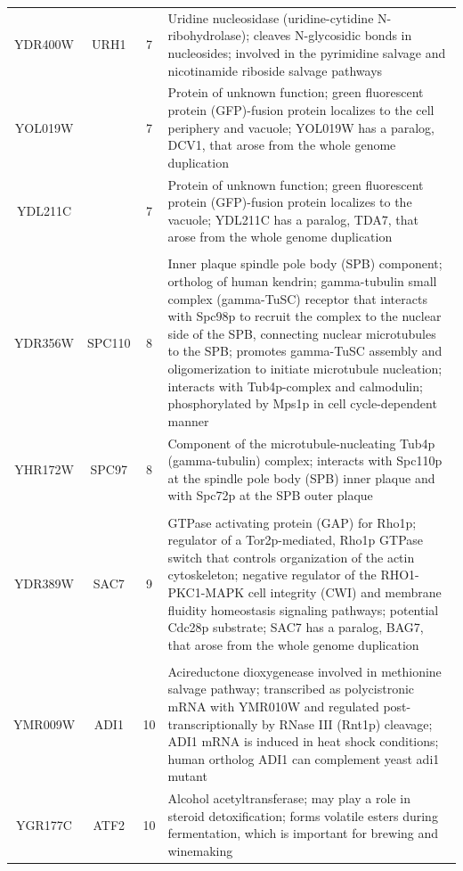 \documentclass[]{article}
\begin{document}
\begin{longtable}{@{\extracolsep{3pt}} cccp{85mm}}
		YDR400W & URH1 & 7 & Uridine nucleosidase (uridine-cytidine N-ribohydrolase); cleaves N-glycosidic bonds in nucleosides; involved in the pyrimidine salvage and nicotinamide riboside salvage pathways \\ 
		YOL019W &  & 7 & Protein of unknown function; green fluorescent protein (GFP)-fusion protein localizes to the cell periphery and vacuole; YOL019W has a paralog, DCV1, that arose from the whole genome duplication \\ 
		YDL211C &  & 7 & Protein of unknown function; green fluorescent protein (GFP)-fusion protein localizes to the vacuole; YDL211C has a paralog, TDA7, that arose from the whole genome duplication \\ \hline \\[-1.8ex]
		YDR356W & SPC110 & 8 & Inner plaque spindle pole body (SPB) component; ortholog of human kendrin; gamma-tubulin small complex (gamma-TuSC) receptor that interacts with Spc98p to recruit the complex to the nuclear side of the SPB, connecting nuclear microtubules to the SPB; promotes gamma-TuSC assembly and oligomerization to initiate microtubule nucleation; interacts with Tub4p-complex and calmodulin; phosphorylated by Mps1p in cell cycle-dependent manner \\ 
		YHR172W & SPC97 & 8 & Component of the microtubule-nucleating Tub4p (gamma-tubulin) complex; interacts with Spc110p at the spindle pole body (SPB) inner plaque and with Spc72p at the SPB outer plaque \\ \hline \\[-1.8ex]
		YDR389W & SAC7 & 9 & GTPase activating protein (GAP) for Rho1p; regulator of a Tor2p-mediated, Rho1p GTPase switch that controls organization of the actin cytoskeleton; negative regulator of the RHO1-PKC1-MAPK cell integrity (CWI) and membrane fluidity homeostasis signaling pathways; potential Cdc28p substrate; SAC7 has a paralog, BAG7, that arose from the whole genome duplication \\ \hline \\[-1.8ex]
		YMR009W & ADI1 & 10 & Acireductone dioxygenease involved in methionine salvage pathway; transcribed as polycistronic mRNA with YMR010W and regulated post-transcriptionally by RNase III (Rnt1p) cleavage; ADI1 mRNA is induced in heat shock conditions; human ortholog ADI1 can complement yeast adi1 mutant \\ 
		YGR177C & ATF2 & 10 & Alcohol acetyltransferase; may play a role in steroid detoxification; forms volatile esters during fermentation, which is important for brewing and winemaking \\ 

\end{longtable}
\end{document}
